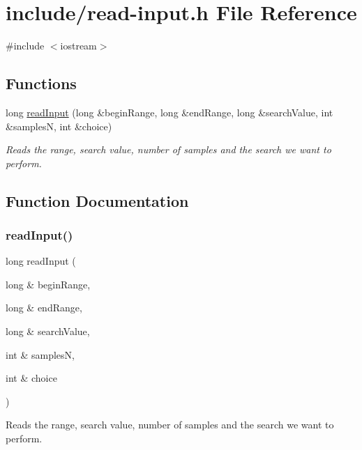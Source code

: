 \hypertarget{read-input_8h}{}\section{include/read-\/input.h File Reference}
\label{read-input_8h}
{\ttfamily \#include $<$iostream$>$}\newline
\subsection*{Functions}
\begin{DoxyCompactItemize}
\item 
long \mbox{\hyperlink{read-input_8h_accc8aed23bef5f738976b4cf30eae03a}{read\+Input}} (long \&begin\+Range, long \&end\+Range, long \&search\+Value, int \&samplesN, int \&choice)
\begin{DoxyCompactList}\small\item\em Reads the range, search value, number of samples and the search we want to perform. \end{DoxyCompactList}\end{DoxyCompactItemize}


\subsection{Function Documentation}
\mbox{\label{read-input_8h_accc8aed23bef5f738976b4cf30eae03a}} 
\subsubsection{\texorpdfstring{readInput()}{readInput()}}
{\footnotesize\ttfamily long read\+Input (\begin{DoxyParamCaption}\item[{long \&}]{begin\+Range,  }\item[{long \&}]{end\+Range,  }\item[{long \&}]{search\+Value,  }\item[{int \&}]{samplesN,  }\item[{int \&}]{choice }\end{DoxyParamCaption})}



Reads the range, search value, number of samples and the search we want to perform. 


